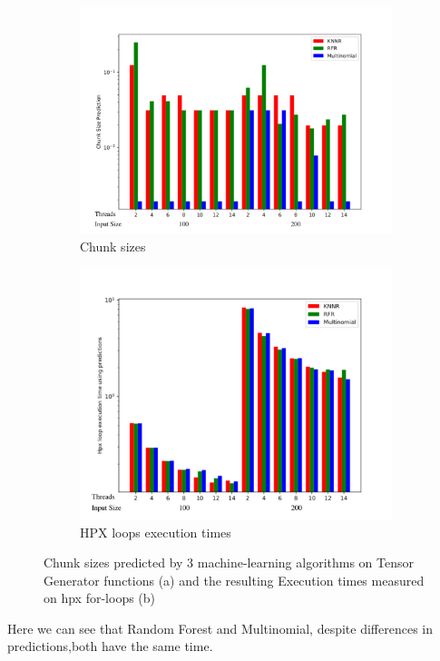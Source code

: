 \begin{figure}[h]
	\centering
	\begin{subfigure}[b]{0.5\textwidth}
		\centering
		\includegraphics[width=\textwidth]{images/bars_tensor_cs.pdf}
		\caption[Network2]%
		{{Chunk sizes}}    
	\end{subfigure}
	\hfill
	\begin{subfigure}[b]{0.49\textwidth}  
		\centering 
		\includegraphics[width=\textwidth]{images/bars_tensor_times.pdf}
		\caption[]%
		{{HPX loops execution times}}    
	\end{subfigure}
	\caption{Chunk sizes predicted by 3 machine-learning algorithms on Tensor Generator functions (a) and the resulting Execution times measured on hpx for-loops (b)} 
\end{figure}
Here we can see that Random Forest and Multinomial, despite differences in predictions,both have the same time.